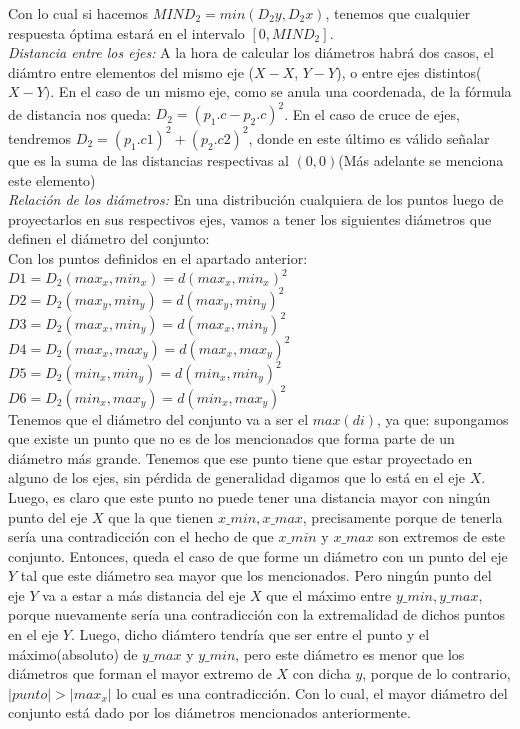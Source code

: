 \documentclass{article}
\begin{document}
Con lo cual si hacemos $MIND_2 = min(D_2y,D_2x)$, tenemos que cualquier respuesta \'optima estar\'a en el intervalo $[0,MIND_2]$.\\

\textit{Distancia entre los ejes:} A la hora de calcular los di\'ametros habr\'a dos casos, el di\'amtro entre elementos del mismo eje ($X-X$, $Y-Y$), o entre ejes distintos($X-Y)$. En el caso de un mismo eje, como se anula una coordenada, de la f\'ormula de distancia nos queda: $D_2 = (p_1.c-p_2.c)^2$. En el caso de cruce de ejes, tendremos $D_2 = (p_1.c1)^2 + (p_2.c2)^2$, donde en este \'ultimo es v\'alido se\~nalar que es la suma de las distancias respectivas al $(0,0)$(M\'as adelante se menciona este elemento)\\

\textit{Relaci\'on de los di\'ametros:} En una distribuci\'on cualquiera de los puntos luego de proyectarlos en sus respectivos ejes, vamos a tener los siguientes di\'ametros que definen el di\'ametro del conjunto:\\
Con los puntos definidos en el apartado anterior:\\
$D1 = D_2(max_x, min_x)= d(max_x, min_x)^2$\\
$D2 = D_2(max_y, min_y)= d(max_y, min_y)^2$\\
$D3 = D_2(max_x, min_y)= d(max_x, min_y)^2$\\
$D4 = D_2(max_x, max_y)= d(max_x, max_y)^2$\\
$D5 = D_2(min_x, min_y)= d(min_x, min_y)^2$\\
$D6 = D_2(min_x, max_y)= d(min_x, max_y)^2$\\

Tenemos que el di\'ametro del conjunto va a ser el $max(di)$, ya que: supongamos que existe un punto que no es de los mencionados que forma parte de un di\'ametro m\'as grande. Tenemos que ese punto tiene que estar proyectado en alguno de los ejes, sin p\'erdida de generalidad digamos que lo est\'a en el eje $X$. Luego, es claro que este punto no puede tener una distancia mayor con ning\'un punto del eje $X$ que la que tienen $x\_min, x\_max$, precisamente porque de tenerla ser\'ia una contradicci\'on con el hecho de que $x\_min$ y $x\_max$ son extremos de este conjunto. Entonces, queda el caso de que forme un di\'ametro con un punto del eje $Y$ tal que este di\'ametro sea mayor que los mencionados. Pero ning\'un punto del eje $Y$ va a estar a m\'as distancia del eje $X$ que el m\'aximo entre $y\_min, y\_max$, porque nuevamente ser\'ia una contradicci\'on con la extremalidad de dichos puntos en el eje $Y$. Luego, dicho di\'amtero tendr\'ia que ser entre el punto y el m\'aximo(absoluto) de $y\_max$ y $y\_min$, pero este di\'ametro es menor que los di\'ametros que forman el mayor extremo de $X$ con dicha $y$, porque de lo contrario, $|punto|>|max_x|$ lo cual es una contradicci\'on. Con lo cual, el mayor di\'ametro del conjunto est\'a dado por los di\'ametros mencionados anteriormente.\\
\end{document}
